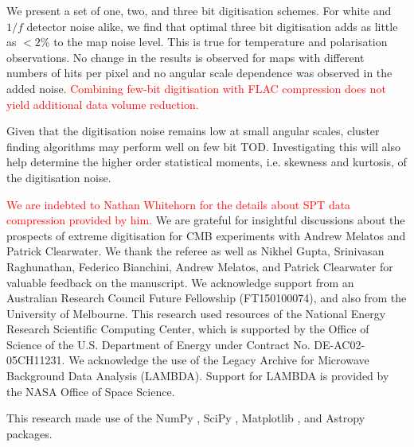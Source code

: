 \documentclass[apj]{emulateapj}
\newcommand{\changed}[1]{\textcolor{Red}{#1}}
\begin{document}
We present a set of one, two, and three bit digitisation schemes. For white and $1/f$ detector noise alike, we find that optimal three bit digitisation adds as little as $<2\%$ to the map noise level. This is true for temperature and polarisation observations. No change in the results is observed for maps with different numbers of hits per pixel and no angular scale dependence was observed in the added noise. \changed{Combining few-bit digitisation with FLAC compression does not yield additional data volume reduction.}

Given that the digitisation noise remains low at small angular scales, cluster finding algorithms may perform well on few bit TOD. Investigating this will also help determine the higher order statistical moments, i.e. skewness and kurtosis, of the digitisation noise.

\acknowledgments %


\changed{We are indebted to Nathan Whitehorn for the details about SPT data compression provided by him.}
We are grateful for insightful discussions about the prospects of extreme digitisation for CMB experiments with Andrew Melatos and Patrick Clearwater.
We thank the referee as well as Nikhel Gupta, Srinivasan Raghunathan, Federico Bianchini, Andrew Melatos, and Patrick Clearwater for valuable feedback on the manuscript.
We acknowledge support from an Australian Research Council Future Fellowship (FT150100074), and also from the University of Melbourne. 
This research used resources of the National Energy Research Scientific Computing Center, which is supported by the Office of Science of the U.S. Department of Energy under Contract No. DE-AC02-05CH11231. 
We acknowledge the use of the Legacy Archive for Microwave Background Data Analysis (LAMBDA). Support for LAMBDA is provided by the NASA Office of Space Science.


This research made use of the NumPy \citep{numpy}, SciPy \citep{scipy}, Matplotlib \citep{matplotlib}, and Astropy \citep{astropy} packages.

\newpage

\appendix
\end{document}
